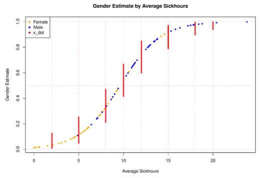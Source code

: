 \documentclass[
  ignorenonframetext,
]{beamer}
\begin{document}
\begin{frame}

\tiny\includegraphics{Schmitt_Marvin_binary_response_files/figure-beamer/unnamed-chunk-24-1.pdf}
\normalsize

\end{frame}
\end{document}

